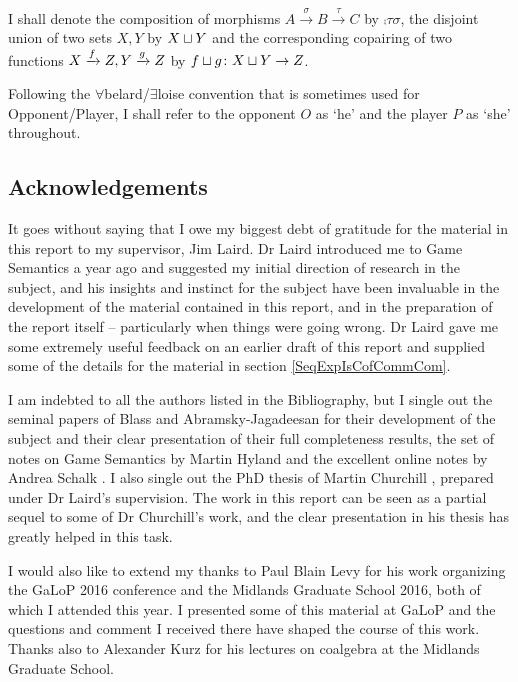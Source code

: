 \documentclass[11pt]{article} %
\begin{document}
I shall denote the composition of morphisms $A\xrightarrow{\sigma}B\xrightarrow{\tau}C$ by $\comp\tau\sigma$, the disjoint union of two sets $X,Y$ by $X\cprd Y$ and the corresponding copairing of two functions $\map{f}{X}{Z},\map{g}{Y}{Z}$ by $\cmap{f\cprd g}{X\cprd Y}{Z}$.  

Following the $\forall$belard/$\exists$loise convention that is sometimes used for Opponent/Player, I shall refer to the opponent $O$ as `he' and the player $P$ as `she' throughout.  

\subsection{Acknowledgements}

It goes without saying that I owe my biggest debt of gratitude for the material in this report to my supervisor, Jim Laird.  Dr Laird introduced me to Game Semantics a year ago and suggested my initial direction of research in the subject, and his insights and instinct for the subject have been invaluable in the development of the material contained in this report, and in the preparation of the report itself -- particularly when things were going wrong.  Dr Laird gave me some extremely useful feedback on an earlier draft of this report and supplied some of the details for the material in section \ref{SeqExpIsCofCommCom}.

I am indebted to all the authors listed in the Bibliography, but I single out the seminal papers of Blass \cite{blassgames} and Abramsky-Jagadeesan \cite{abramskyjagadeesangames} for their development of the subject and their clear presentation of their full completeness results, the set of notes on Game Semantics by Martin Hyland \cite{hyland1997games} and the excellent online notes by Andrea Schalk \cite{Schalk2001GsNotes,SchalkWhatIs}.  I also single out the PhD thesis of Martin Churchill \cite{martinsthesis}, prepared under Dr Laird's supervision.  The work in this report can be seen as a partial sequel to some of Dr Churchill's work, and the clear presentation in his thesis has greatly helped in this task.  

I would also like to extend my thanks to Paul Blain Levy for his work organizing the GaLoP 2016 conference and the Midlands Graduate School 2016, both of which I attended this year.  I presented some of this material at GaLoP and the questions and comment I received there have shaped the course of this work.  Thanks also to Alexander Kurz for his lectures on coalgebra at the Midlands Graduate School.  
\end{document}
